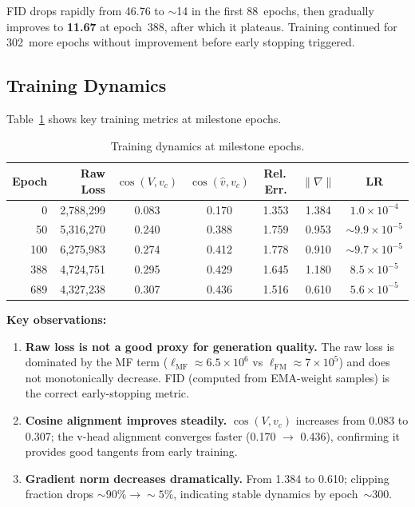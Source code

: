 \documentclass[11pt,a4paper]{article}
\begin{document}
FID drops rapidly from 46.76 to ${\sim}$14 in the first 88~epochs, then
gradually improves to \textbf{11.67} at epoch~388, after which it plateaus.
Training continued for 302~more epochs without improvement before early
stopping triggered.

\subsection{Training Dynamics}

Table~\ref{tab:dynamics} shows key training metrics at milestone epochs.

\begin{table}[ht]
\centering
\caption{Training dynamics at milestone epochs.}
\label{tab:dynamics}
\begin{tabular}{rrccccc}
\toprule
\textbf{Epoch} & \textbf{Raw Loss} & $\cos(V,v_c)$ & $\cos(\hat{v},v_c)$ & \textbf{Rel.\,Err.} & $\|\nabla\|$ & \textbf{LR} \\
\midrule
0   & 2,788,299 & 0.083 & 0.170 & 1.353 & 1.384 & $1.0\!\times\!10^{-4}$ \\
50  & 5,316,270 & 0.240 & 0.388 & 1.759 & 0.953 & ${\sim}9.9\!\times\!10^{-5}$ \\
100 & 6,275,983 & 0.274 & 0.412 & 1.778 & 0.910 & ${\sim}9.7\!\times\!10^{-5}$ \\
388 & 4,724,751 & 0.295 & 0.429 & 1.645 & 1.180 & $8.5\!\times\!10^{-5}$ \\
689 & 4,327,238 & 0.307 & 0.436 & 1.516 & 0.610 & $5.6\!\times\!10^{-5}$ \\
\bottomrule
\end{tabular}
\end{table}

\textbf{Key observations:}
\begin{enumerate}[nosep]
  \item \textbf{Raw loss is not a good proxy for generation quality.}  The raw
    loss is dominated by the MF term ($\ell_{\mathrm{MF}} \approx
    6.5\!\times\!10^6$ vs $\ell_{\mathrm{FM}} \approx
    7\!\times\!10^5$) and does not monotonically decrease.  FID (computed from
    EMA-weight samples) is the correct early-stopping metric.
  \item \textbf{Cosine alignment improves steadily.}  $\cos(V,v_c)$ increases
    from 0.083 to 0.307; the v-head alignment converges faster (0.170 $\to$
    0.436), confirming it provides good tangents from early training.
  \item \textbf{Gradient norm decreases dramatically.}  From 1.384 to 0.610;
    clipping fraction drops ${\sim}90\%\!\to\!{\sim}5\%$, indicating stable
    dynamics by epoch~${\sim}300$.
\end{enumerate}
\end{document}
